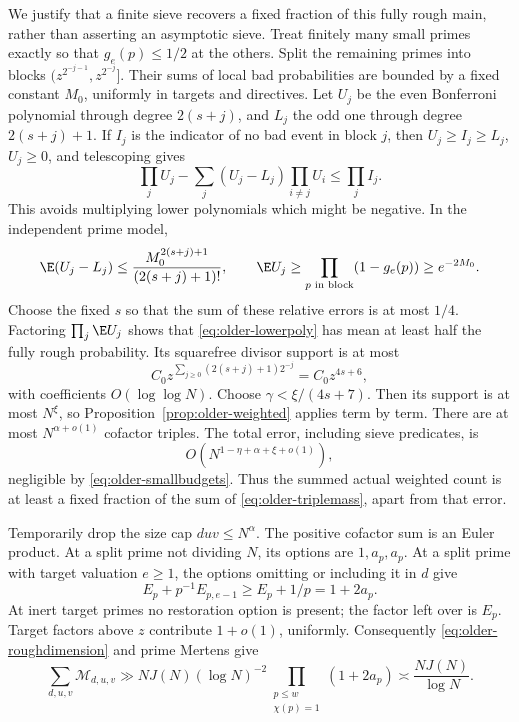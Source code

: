 We justify that a finite sieve recovers a fixed fraction of this
fully rough main, rather than asserting an asymptotic sieve.
Treat finitely many small primes exactly so that \(g_e(p)\le1/2\)
at the others.  Split the remaining primes into blocks
\((z^{2^{-j-1}},z^{2^{-j}}]\).
Their sums of local bad probabilities are bounded by a fixed
constant \(M_0\), uniformly in targets and directives.
Let \(U_j\) be the even Bonferroni polynomial through degree
\(2(s+j)\), and \(L_j\) the odd one through degree \(2(s+j)+1\).
If \(I_j\) is the indicator of no bad event in block \(j\), then
\(U_j\ge I_j\ge L_j\), \(U_j\ge0\), and telescoping gives
\begin{equation}\label{eq:older-lowerpoly}
 \prod_jU_j-\sum_j(U_j-L_j)\prod_{i\ne j}U_i
                                      \le\prod_jI_j .
\end{equation}
This avoids multiplying lower polynomials which might be negative.
In the independent prime model,
\[
 \E(U_j-L_j)\le\frac{M_0^{2(s+j)+1}}{(2(s+j)+1)!},
 \qquad \E U_j\ge\prod_{p\text{ in block}}(1-g_e(p))
                                             \ge e^{-2M_0}.
\]
Choose the fixed \(s\) so that the sum of these relative errors
is at most \(1/4\).
Factoring \(\prod_j\E U_j\) shows that
\eqref{eq:older-lowerpoly} has mean at least half the fully rough
probability.  Its squarefree divisor support is at most
\[
 C_0z^{\sum_{j\ge0}(2(s+j)+1)2^{-j}}
                               =C_0z^{4s+6},
\]
with coefficients \(O(\log\log N)\).
Choose \(\gamma<\xi/(4s+7)\).
Then its support is at most \(N^\xi\), so
Proposition~\ref{prop:older-weighted} applies term by term.
There are at most \(N^{\alpha+o(1)}\) cofactor triples.
The total error, including sieve predicates, is
\[
                  O(N^{1-\eta+\alpha+\xi+o(1)}),
\]
negligible by \eqref{eq:older-smallbudgets}.
Thus the summed actual weighted count is at least a fixed fraction
of the sum of \eqref{eq:older-triplemass}, apart from that error.

Temporarily drop the size cap \(duv\le N^\alpha\).
The positive cofactor sum is an Euler product.
At a split prime not dividing \(N\), its options are
\(1,a_p,a_p\).
At a split prime with target valuation \(e\ge1\), the options
omitting or including it in \(d\) give
\[
 E_p+p^{-1}E_{p,e-1}\ge E_p+1/p=1+2a_p.
\]
At inert target primes no restoration option is present; the
factor left over is \(E_p\).
Target factors above \(z\) contribute \(1+o(1)\), uniformly.
Consequently \eqref{eq:older-roughdimension} and prime Mertens give
\begin{equation}\label{eq:older-restoredmass}
 \sum_{d,u,v}\mathcal M_{d,u,v}
 \gg NJ(N)(\log N)^{-2}
          \prod_{\substack{p\le w\\\chi(p)=1}}(1+2a_p)
 \asymp \frac{NJ(N)}{\log N}.
\end{equation}


